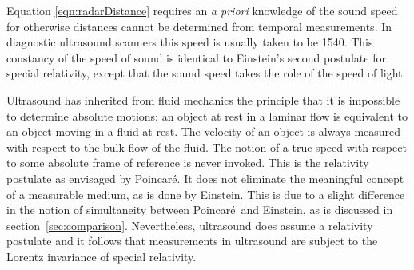 \documentclass[10pt, fleqn,final,showtrims,oldfontcommands]{article} %
\newcommand{\secref}[1]{section~\ref{sec:#1}}
\newcommand{\eqnref}[1]{\ref{eqn:#1}}
\newcommand{\Poincare}{Poincar{\'e}}
\begin{document}
Equation \eqnref{radarDistance} requires an {\em a priori} knowledge of the sound speed
for otherwise distances cannot be determined from temporal measurements.
In diagnostic ultrasound scanners this speed is usually taken to be \unit{1540}\metre\reciprocal\second.
This constancy of the speed of sound is identical to Einstein's  second postulate for special relativity\cite{Einstein1905},
except that the sound speed takes the role of the speed of light.

Ultrasound has inherited from fluid mechanics the principle that it is impossible to determine absolute motions:
an object at rest in a laminar flow is equivalent to an object moving in a fluid at rest.
The velocity of an object is always measured with respect to the bulk flow of the fluid.
The notion of a true speed with respect to some absolute frame of reference is never  invoked.
This is the relativity postulate as envisaged by \Poincare.
It does not  eliminate the meaningful concept of a measurable medium,
as is done by Einstein.
This is due to a slight difference in the notion of simultaneity between \Poincare\ and Einstein, 
as is discussed in \secref{comparison}.
Nevertheless, ultrasound does assume a relativity postulate
and it follows that  measurements in ultrasound are subject to the Lorentz invariance of special relativity.


\end{document}
